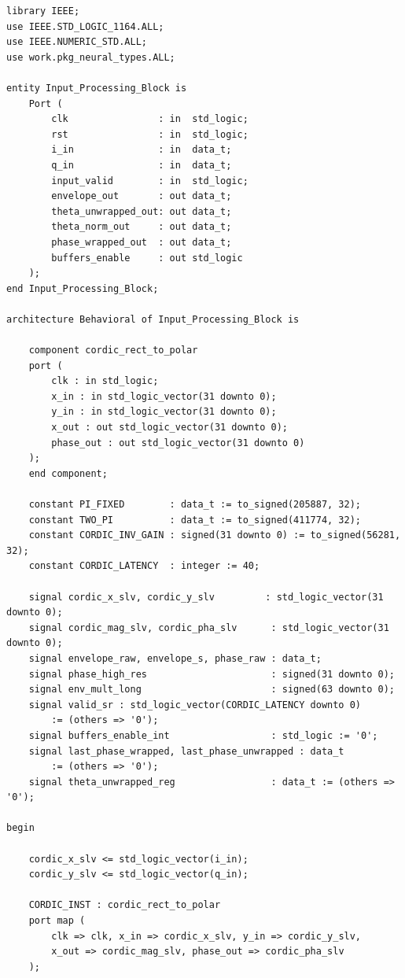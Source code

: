 \documentclass[a4paper,12pt]{article}
\begin{document}
\begin{lstlisting}[style=vhdlstyle,
    caption={C\'odigo VHDL do \texttt{Input\_Processing\_Block}.},
    label={lst:ipb}]
library IEEE;
use IEEE.STD_LOGIC_1164.ALL;
use IEEE.NUMERIC_STD.ALL;
use work.pkg_neural_types.ALL;

entity Input_Processing_Block is
    Port (
        clk                : in  std_logic;
        rst                : in  std_logic;
        i_in               : in  data_t;
        q_in               : in  data_t;
        input_valid        : in  std_logic;
        envelope_out       : out data_t;
        theta_unwrapped_out: out data_t;
        theta_norm_out     : out data_t;
        phase_wrapped_out  : out data_t;
        buffers_enable     : out std_logic
    );
end Input_Processing_Block;

architecture Behavioral of Input_Processing_Block is

    component cordic_rect_to_polar
    port (
        clk : in std_logic;
        x_in : in std_logic_vector(31 downto 0);
        y_in : in std_logic_vector(31 downto 0);
        x_out : out std_logic_vector(31 downto 0);
        phase_out : out std_logic_vector(31 downto 0)
    );
    end component;

    constant PI_FIXED        : data_t := to_signed(205887, 32);
    constant TWO_PI          : data_t := to_signed(411774, 32);
    constant CORDIC_INV_GAIN : signed(31 downto 0) := to_signed(56281, 32);
    constant CORDIC_LATENCY  : integer := 40;

    signal cordic_x_slv, cordic_y_slv         : std_logic_vector(31 downto 0);
    signal cordic_mag_slv, cordic_pha_slv      : std_logic_vector(31 downto 0);
    signal envelope_raw, envelope_s, phase_raw : data_t;
    signal phase_high_res                      : signed(31 downto 0);
    signal env_mult_long                       : signed(63 downto 0);
    signal valid_sr : std_logic_vector(CORDIC_LATENCY downto 0)
        := (others => '0');
    signal buffers_enable_int                  : std_logic := '0';
    signal last_phase_wrapped, last_phase_unwrapped : data_t
        := (others => '0');
    signal theta_unwrapped_reg                 : data_t := (others => '0');

begin

    cordic_x_slv <= std_logic_vector(i_in);
    cordic_y_slv <= std_logic_vector(q_in);

    CORDIC_INST : cordic_rect_to_polar
    port map (
        clk => clk, x_in => cordic_x_slv, y_in => cordic_y_slv,
        x_out => cordic_mag_slv, phase_out => cordic_pha_slv
    );


\end{lstlisting}
\end{document}
